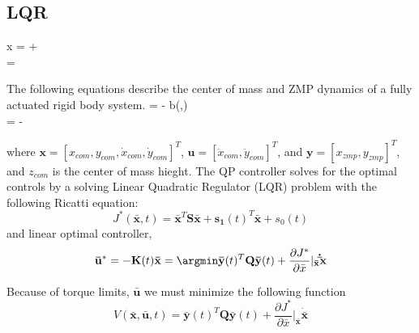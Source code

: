 \documentclass[letterpaper, 10 pt, conference]{ieeeconf}  %
\begin{document}
\subsection{LQR}
\begin{multiline}
\dot x =  +  \\
 = \] 
\] 
\end{multiline}

\begin{multiline}
The following equations describe the center of mass and ZMP dynamics of a fully actuated rigid body system.
 =  - b(,\mathbf{\dotx}) \\
= \]  - 
 
\end{multiline}

where $\mathbf{x} = [x_{com},y_{com},\dot x_{com}, \dot y_{com}]^T $, $\mathbf{u} = [\ddot x_{com}, \ddot y_{com}]^T$, and $\mathbf{y} = [x_{zmp},y_{zmp}]^T$, and $z_{com}$ is the center of mass hieght. The QP controller solves for the optimal controls by a solving Linear Quadratic Regulator (LQR) problem with the following Ricatti equation:
\begin{equation}
J^\ast(\mathbf{\bar{x}},t) = \mathbf{\bar{x}}^T \mathbf{S \bar{x}} + \mathbf{s_1}(t)^T \mathbf{\bar{x}} + s_0(t)
\end{equation}
and linear optimal controller,
\begin{equation}
\mathbf{\bar{u}^\ast} = - \mathbf{K}(t)\mathbf{\bar{x}} \\
= \argmin \mathbf{\bar{y}}(t)^T \mathbf{Q} \mathbf{\bar{y}}(t) + \frac{\partial J^\ast}{\partial \bar{x}} \vert_\mathbf{\bar{x}} \mathbf{\dot \bar{x}}
\end{equation}

Because of torque limits, $\mathbf{\bar{u}}$ we must minimize the following function
\begin{equation}
V(\mathbf{\bar{x}}, \mathbf{\bar{u}},t) = \mathbf{\bar{y}}(t)^T \mathbf{Q} \mathbf{\bar{y}}(t) + \frac{\partial J^\ast}{\partial \bar{x}} \vert_\mathbf{\bar{x}} \mathbf{\dot \bar{x}}
\end{equation}
\end{document}

